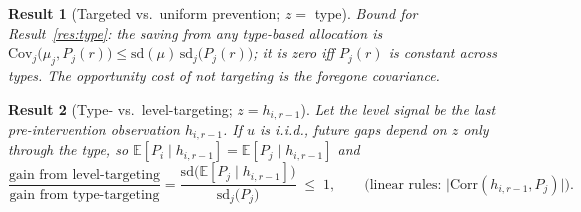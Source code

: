 \documentclass[11pt]{article}
\newtheorem{result}{Result}
\theoremstyle{remark}
\newtheorem{remark}{Remark}
\newcommand{\E}{\mathbb{E}}
\newcommand{\Cov}{\mathrm{Cov}}
\newcommand{\Corr}{\mathrm{Corr}}
\begin{document}

\begin{result}[Targeted vs.\ uniform prevention; $z=$ type]\label{res:T1}
Bound for Result~\ref{res:type}: the saving from any type-based allocation is $\Cov_j\bigl(\mu_j,P_j(r)\bigr)\le\mathrm{sd}(\mu)\,\mathrm{sd}_j\bigl(P_j(r)\bigr)$; it is zero iff $P_j(r)$ is constant across types.
The opportunity cost of \emph{not} targeting is the foregone covariance.
\end{result}

\begin{result}[Type- vs.\ level-targeting; $z=h_{i,r-1}$]\label{res:T2}
Let the level signal be the last pre-intervention observation $h_{i,r-1}$. If $u$ is i.i.d., future gaps depend on $z$ only through the type, so $\E[P_i\mid h_{i,r-1}]=\E[P_j\mid h_{i,r-1}]$ and
\begin{equation}
\frac{\text{gain from level-targeting}}{\text{gain from type-targeting}}
=\frac{\mathrm{sd}\bigl(\E[P_j\mid h_{i,r-1}]\bigr)}{\mathrm{sd}_j\bigl(P_j\bigr)}\;\le\;1,
\qquad
\text{(linear rules: } \bigl|\Corr(h_{i,r-1},P_j)\bigr| \text{)}.
\end{equation}
\end{result}
\end{document}
